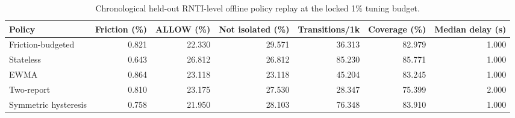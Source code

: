 \begin{table}[t]
\centering
\scriptsize
\caption{Chronological held-out RNTI-level offline policy replay at the locked 1\% tuning budget.}
\label{tab:heldout-policy}
\begin{tabular}{lrrrrrr}
\hline
Policy & Friction (\%) & ALLOW (\%) & Not isolated (\%) & Transitions/1k & Coverage (\%) & Median delay (s) \\
\hline
Friction-budgeted & 0.821 & 22.330 & 29.571 & 36.313 & 82.979 & 1.000 \\
Stateless & 0.643 & 26.812 & 26.812 & 85.230 & 85.771 & 1.000 \\
EWMA & 0.864 & 23.118 & 23.118 & 45.204 & 83.245 & 1.000 \\
Two-report & 0.810 & 23.175 & 27.530 & 28.347 & 75.399 & 2.000 \\
Symmetric hysteresis & 0.758 & 21.950 & 28.103 & 76.348 & 83.910 & 1.000 \\
\hline
\end{tabular}
\end{table}
